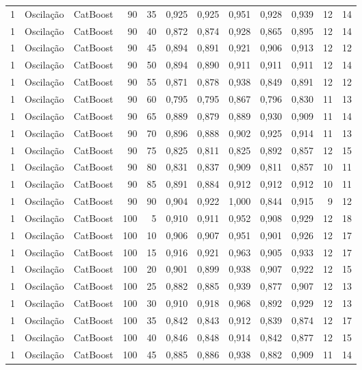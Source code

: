 \begin{longtable}{@{}rllrrrrrrrrr@{}}
1 & Oscilação & CatBoost & 90 & 35 & 0,925 & 0,925 & 0,951 & 0,928 & 0,939 & 12 & 14 \\
1 & Oscilação & CatBoost & 90 & 40 & 0,872 & 0,874 & 0,928 & 0,865 & 0,895 & 12 & 14 \\
1 & Oscilação & CatBoost & 90 & 45 & 0,894 & 0,891 & 0,921 & 0,906 & 0,913 & 12 & 12 \\
1 & Oscilação & CatBoost & 90 & 50 & 0,894 & 0,890 & 0,911 & 0,911 & 0,911 & 12 & 14 \\
1 & Oscilação & CatBoost & 90 & 55 & 0,871 & 0,878 & 0,938 & 0,849 & 0,891 & 12 & 12 \\
1 & Oscilação & CatBoost & 90 & 60 & 0,795 & 0,795 & 0,867 & 0,796 & 0,830 & 11 & 13 \\
1 & Oscilação & CatBoost & 90 & 65 & 0,889 & 0,879 & 0,889 & 0,930 & 0,909 & 11 & 14 \\
1 & Oscilação & CatBoost & 90 & 70 & 0,896 & 0,888 & 0,902 & 0,925 & 0,914 & 11 & 13 \\
1 & Oscilação & CatBoost & 90 & 75 & 0,825 & 0,811 & 0,825 & 0,892 & 0,857 & 12 & 15 \\
1 & Oscilação & CatBoost & 90 & 80 & 0,831 & 0,837 & 0,909 & 0,811 & 0,857 & 10 & 11 \\
1 & Oscilação & CatBoost & 90 & 85 & 0,891 & 0,884 & 0,912 & 0,912 & 0,912 & 10 & 11 \\
1 & Oscilação & CatBoost & 90 & 90 & 0,904 & 0,922 & 1,000 & 0,844 & 0,915 & 9 & 12 \\
1 & Oscilação & CatBoost & 100 & 5 & 0,910 & 0,911 & 0,952 & 0,908 & 0,929 & 12 & 18 \\
1 & Oscilação & CatBoost & 100 & 10 & 0,906 & 0,907 & 0,951 & 0,901 & 0,926 & 12 & 17 \\
1 & Oscilação & CatBoost & 100 & 15 & 0,916 & 0,921 & 0,963 & 0,905 & 0,933 & 12 & 17 \\
1 & Oscilação & CatBoost & 100 & 20 & 0,901 & 0,899 & 0,938 & 0,907 & 0,922 & 12 & 15 \\
1 & Oscilação & CatBoost & 100 & 25 & 0,882 & 0,885 & 0,939 & 0,877 & 0,907 & 12 & 13 \\
1 & Oscilação & CatBoost & 100 & 30 & 0,910 & 0,918 & 0,968 & 0,892 & 0,929 & 12 & 13 \\
1 & Oscilação & CatBoost & 100 & 35 & 0,842 & 0,843 & 0,912 & 0,839 & 0,874 & 12 & 17 \\
1 & Oscilação & CatBoost & 100 & 40 & 0,846 & 0,848 & 0,914 & 0,842 & 0,877 & 12 & 15 \\
1 & Oscilação & CatBoost & 100 & 45 & 0,885 & 0,886 & 0,938 & 0,882 & 0,909 & 11 & 14 \\

\end{longtable}
